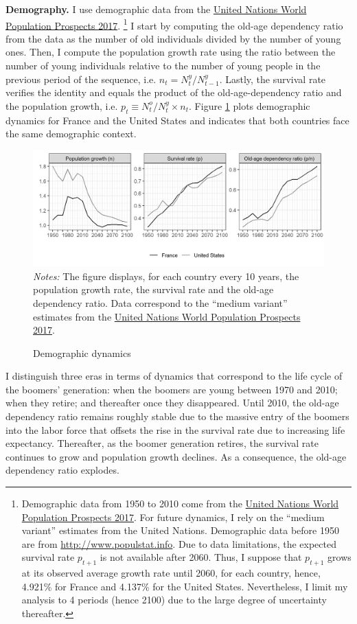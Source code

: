 \textbf{Demography.} I use demographic data from the \href{https://population.un.org/wpp/}{United Nations World Population Prospects 2017}.%
\footnote{Demographic data from 1950 to 2010 come from the \href{https://population.un.org/wpp/}{United Nations World Population Prospects 2017}. For future dynamics, I rely on the ``medium variant'' estimates from the United Nations. Demographic data before 1950 are from \href{http://www.populstat.info}{http://www.populstat.info}. Due to data limitations, the expected survival rate $p_{t+1}$ is not available after 2060. Thus, I suppose that $p_{t+1}$ grows at its observed average growth rate until 2060, for each country, hence, 4.921\% for France and 4.137\% for the United States. Nevertheless, I limit my analysis to 4 periods (hence 2100) due to the large degree of uncertainty thereafter.}
I start by computing the old-age dependency ratio from the data as the number of old individuals divided by the number of young ones. Then, I compute the population growth rate using the ratio between the number of young individuals relative to the number of young people in the previous period of the sequence, i.e. $n_t = N_t^y/N_{t-1}^y$. Lastly, the survival rate verifies the identity and equals the product of the old-age-dependency ratio and the population growth, i.e. $p_t \equiv N_t^o/N_t^y\times n_t$. Figure \ref{chap1-fig:demo} plots demographic dynamics for France and the United States and indicates that both countries face the same demographic context.
\begin{figure}[!tb]
	\centering
	\caption{Demographic dynamics}\label{chap1-fig:demo}
	\includegraphics[width=\linewidth]{chap1/graphic/quant-demo.png}
	\vspace{-3em}
	\justify\singlespacing\footnotesize\textit{Notes:} The figure displays, for each country every 10 years, the population growth rate, the survival rate and the old-age dependency ratio. Data correspond to the ``medium variant'' estimates from the  \href{https://population.un.org/wpp/}{United Nations World Population Prospects 2017}.
\end{figure}
I distinguish three eras in terms of dynamics that correspond to the life cycle of the boomers' generation: when the boomers are young between 1970 and 2010; when they retire; and thereafter once they disappeared. Until 2010, the old-age dependency ratio remains roughly stable due to the massive entry of the boomers into the labor force that offsets the rise in the survival rate due to increasing life expectancy. Thereafter, as the boomer generation retires, the survival rate continues to grow and population growth declines. As a consequence, the old-age dependency ratio explodes.


